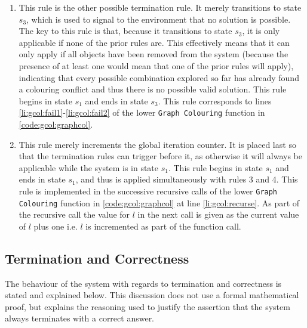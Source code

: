\begin{enumerate}
\item This rule is the other possible termination rule.  It merely transitions to state \(s_3\), which is used to signal to the environment that no solution is possible.  The key to this rule is that, because it transitions to state \(s_3\), it is only applicable if none of the prior rules are.  This effectively means that it can only apply if all \bo{} objects have been removed from the system (because the presence of at least one \bo{} would mean that one of the prior rules will apply), indicating that every possible combination explored so far has already found a colouring conflict and thus there is no possible valid solution.  This rule begins in state \(s_1\) and ends in state \(s_3\).  This rule corresponds to lines \ref{li:gcol:fail1}-\ref{li:gcol:fail2} of the lower \texttt{Graph Colouring} function in \autoref{code:gcol:graphcol}.


\item This rule merely increments the global iteration counter.  It is placed last so that the termination rules can trigger before it, as otherwise it will always be applicable while the system is in state \(s_1\).  This rule begins in state \(s_1\) and ends in state \(s_1\), and thus is applied simultaneously with rules 3 and 4.  This rule is implemented in the successive recursive calls of the lower \texttt{Graph Colouring} function in \autoref{code:gcol:graphcol} at line \ref{li:gcol:recurse}.  As part of the recursive call the value for \(l\) in the next call is given as the current value of \(l\) plus one i.e. \(l\) is incremented as part of the function call.
\end{enumerate}

\subsection{Termination and Correctness}
The behaviour of the system with regards to termination and correctness is stated and explained below.  This discussion does not use a formal mathematical proof, but explains the reasoning used to justify the assertion that the system always terminates with a correct answer.

